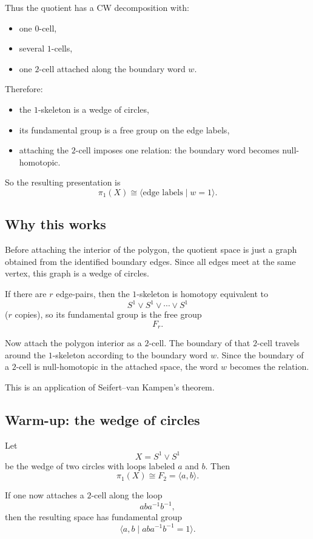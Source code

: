 \documentclass[12pt,a4paper]{article}
\theoremstyle{notespace}
\begin{document}
Thus the quotient has a CW decomposition with:
\begin{itemize}
	\item one \(0\)-cell,
	\item several \(1\)-cells,
	\item one \(2\)-cell attached along the boundary word \(w\).
\end{itemize}

Therefore:
\begin{itemize}
	\item the \(1\)-skeleton is a wedge of circles,
	\item its fundamental group is a free group on the edge labels,
	\item attaching the \(2\)-cell imposes one relation: the boundary word becomes null-homotopic.
\end{itemize}

So the resulting presentation is
\[
\pi_1(X)\cong \langle \text{edge labels}\mid w=1\rangle.
\]

\subsection{Why this works}

Before attaching the interior of the polygon, the quotient space is just a graph obtained from the identified boundary edges. Since all edges meet at the same vertex, this graph is a wedge of circles.

If there are \(r\) edge-pairs, then the \(1\)-skeleton is homotopy equivalent to
\[
S^1\vee S^1\vee \cdots \vee S^1
\]
(\(r\) copies), so its fundamental group is the free group
\[
F_r.
\]

Now attach the polygon interior as a \(2\)-cell. The boundary of that \(2\)-cell travels around the \(1\)-skeleton according to the boundary word \(w\). Since the boundary of a \(2\)-cell is null-homotopic in the attached space, the word \(w\) becomes the relation.

This is an application of Seifert--van Kampen's theorem.

\subsection{Warm-up: the wedge of circles}

Let
\[
X=S^1\vee S^1
\]
be the wedge of two circles with loops labeled \(a\) and \(b\). Then
\[
\pi_1(X)\cong F_2=\langle a,b\rangle.
\]

If one now attaches a \(2\)-cell along the loop
\[
aba^{-1}b^{-1},
\]
then the resulting space has fundamental group
\[
\langle a,b\mid aba^{-1}b^{-1}=1\rangle.
\]
\end{document}
